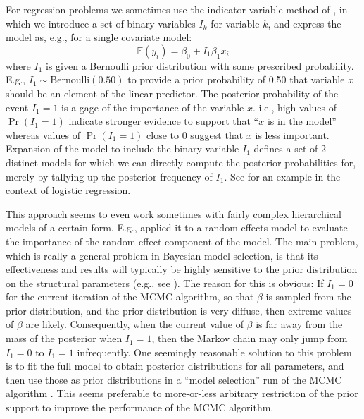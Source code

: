 For regression problems we sometimes use the indicator variable method
of \citet{kuo_mallick:1998}, in 
which we introduce a set of binary variables $I_{k}$ for variable
$k$, and express the model as, e.g., for a single covariate model:
 \[
 \mathbb{E}(y_i) = \beta_0 + I_{1} \beta_1 x_{i}
\]
where $I_{1}$ is given a Bernoulli prior distribution with some prescribed
probability. E.g., $I_{1} \sim \mbox{Bernoulli}(0.50)$ to provide a prior probability
of 0.50 that variable $x$ should be an element of the linear
predictor. The posterior probability of the event $I_{1}=1$ is a gage of
the importance of the variable $x$. i.e., high values of $\Pr(I_{1}=1)$
indicate stronger evidence to support that ``$x$ is in the model''
whereas values of $\Pr(I_{1}=1)$ close to 0 suggest that $x$ is less
important.  Expansion of the model to include the binary variable
$I_{1}$ defines a set of 2 distinct models for which we can directly
compute the posterior probabilities for, merely by tallying up the
posterior frequency of $I_{1}$. See
\citet[][Chapt. 3]{royle_dorazio:2008} for an example in the context
of logistic regression. 

This approach seems to even work sometimes
with fairly complex hierarchical models of a certain form. E.g.,
\citet{royle:2008} applied it to a random effects model to evaluate
the importance of the random effect component of the model.  The main
problem, which is really a general problem in Bayesian model
selection, is that its effectiveness and results will
typically be highly sensitive to the prior distribution on the
structural parameters (e.g., see \citet[][table 3.6]{royle_dorazio:2008}).
The reason for this is obvious: If $I_{1} = 0$ for the current
iteration of the MCMC algorithm, so that $\beta$ is sampled from the
prior distribution, and the prior distribution is very diffuse, then
extreme values of $\beta$ are likely. Consequently, when the current value of
$\beta$ is
far away from the mass of the posterior when $I_{1}=1$, then the Markov
chain may only jump from $I_{1}=0$ to $I_{1}=1$ infrequently.  One seemingly
reasonable solution to this problem 
is to fit the full
model to obtain posterior distributions for all parameters, and then
use those as prior distributions in a ``model selection'' run of the
MCMC algorithm \citep{aitkin:1991}.  This seems preferable to more-or-less arbitrary restriction of
the prior support to improve the performance of the MCMC algorithm.

